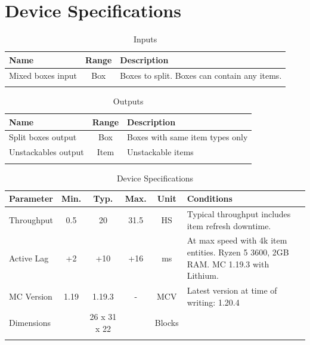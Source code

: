 \documentclass[10pt]{datasheet}
\begin{document}
\onecolumn

\section{Device Specifications}

\begin{table}[h]
    \caption{Inputs}
    \begin{tabularx}{\textwidth}{l | c | X}
        \thickhline
        \textbf{Name} & \textbf{Range} & \textbf{Description} \\
        \hline
        Mixed boxes input & Box & Boxes to split. Boxes can contain any items. \\
        \thickhline
\end{tabularx}
\end{table}

\begin{table}[h]
    \caption{Outputs}
    \begin{tabularx}{\textwidth}{l | c | X}
        \thickhline
        \textbf{Name} & \textbf{Range} & \textbf{Description} \\
        \hline
        Split boxes output & Box & Boxes with same item types only \\
        \hline
        Unstackables output & Item & Unstackable items \\
        \thickhline
\end{tabularx}
\end{table}

\begin{table}[h]
    \caption{Device Specifications}
    \begin{tabularx}{\textwidth}{l | c c c | c | X}
        \thickhline
        \textbf{Parameter} & \textbf{Min.} & \textbf{Typ.} & \textbf{Max.} &
        \textbf{Unit} & \textbf{Conditions} \\
        \hline
        Throughput  & 0.5 & 20 & 31.5 & HS & Typical throughput includes item refresh downtime. \\
        \hline
        Active Lag & +2 & +10 & +16 & ms & At max speed with 4k item entities. Ryzen 5 3600, 2GB RAM. MC 1.19.3 with Lithium. \\
        \hline
        MC Version & 1.19 & 1.19.3 & - & MCV & Latest version at time of writing: 1.20.4\\
        \hline
        Dimensions & & 26 x 31 x 22 & & Blocks & \\
        \thickhline
\end{tabularx}
\end{table}
\end{document}
